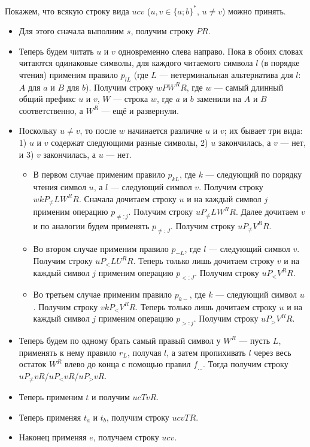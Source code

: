 \documentclass[12pt,a4paper]{article}
\begin{document}
\begin{problem}{5}
        Покажем, что всякую строку вида $ucv$ ($u, v \in \{a; b\}^*$, $u \neq v$) можно принять.
        \begin{itemize}
            \item Для этого сначала выполним $s$, получим строку $PR$.
            \item Теперь будем читать $u$ и $v$ одновременно слева направо. Пока в обоих словах читаются одинаковые символы, для каждого читаемого символа $l$ (в порядке чтения) применим правило $p_{lL}$ (где $L$ --- нетерминальная альтернатива для $l$: $A$ для $a$ и $B$ для $b$). Получим строку $wPW^RR$, где $w$ --- самый длинный общий префикс $u$ и $v$, $W$ --- строка $w$, где $a$ и $b$ заменили на $A$ и $B$ соответственно, а $W^R$ --- ещё и развернули.
            \item Поскольку $u \neq v$, то после $w$ начинается различие $u$ и $v$; их бывает три вида: 1) $u$ и $v$ содержат следующими разные символы, 2) $u$ закончилась, а $v$ --- нет, и 3) $v$ закончилась, а $u$ --- нет.
                \begin{itemize}
                    \item В первом случае применим правило $p_{kL}$, где $k$ --- следующий по порядку чтения символ $u$, а $l$ --- следующий символ $v$. Получим строку $wkP_{\neq}LW^RR$. Сначала дочитаем строку $u$ и на каждый символ $j$ применим операцию $p_{\neq: j}$. Получим строку $uP_{\neq}LW^RR$. Далее дочитаем $v$ и по аналогии будем применять $p_{\neq: J}$. Получим строку $uP_{\neq}V^RR$.
                    \item Во втором случае применим правило $p_{{-}L}$, где $l$ --- следующий символ $v$. Получим строку $uP_<LU^RR$. Теперь только лишь дочитаем строку $v$ и на каждый символ $j$ применим операцию $p_{<: J}$. Получим строку $uP_<V^RR$.
                    \item Во третьем случае применим правило $p_{k{-}}$, где $k$ --- следующий символ $u$. Получим строку $vkP_<V^RR$. Теперь только лишь дочитаем строку $u$ и на каждый символ $j$ применим операцию $p_{>: j}$. Получим строку $uP_>V^RR$.
                \end{itemize}
            \item Теперь будем по одному брать самый правый символ у $W^R$ --- пусть $L$, применять к нему правило $r_L$, получая $l$, а затем пропихивать $l$ через весь остаток $W^R$ влево до конца с помощью правил $f_{\dots}$. Тогда получим строку $uP_{\neq}vR$/$uP_<vR$/$uP_>vR$.
            \item Теперь применим $t$ и получим $ucTvR$.
            \item Теперь применяя $t_a$ и $t_b$, получим строку $ucvTR$.
            \item Наконец применяя $e$, получаем строку $ucv$.
        \end{itemize}
    \end{problem}
\end{document}
